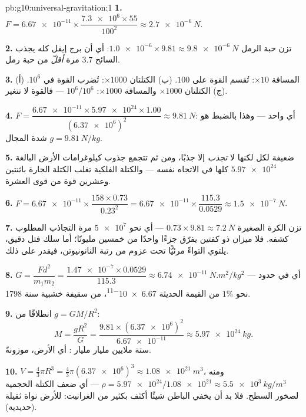 \begin{solution}{pb:g10:universal-gravitation:1}
\textbf{1.} $F = \num{6.67e-11} \times
\dfrac{\num{7.3e6} \times 55}{100^2} \approx \qty{2.7e-6}{N}$.

\textbf{2.} تزن حبة الرمل
$\num{1.0e-6} \times 9.81 \approx \qty{9.8e-6}{N}$: أي أن برج إيفل كله
يجذب السائح $3.7$ مرة \emph{أقلّ} من 
حبة رمل.

\textbf{3.} (أ) المسافة $\times 10$: تُقسم القوة على $100$.
(ب) الكتلتان $\times 1000$: تُضرب القوة في $10^6$.
(ج) الكتلتان $\times 1000$ والمسافة $\times 1000$:
$10^6 / 10^6$ --- فالقوة لا تتغير.

\textbf{4.} $F = \dfrac{\num{6.67e-11} \times \num{5.97e24} \times
1.00}{(\num{6.37e6})^2} \approx \qty{9.81}{N}$: أي  
واحد --- وهذا بالضبط هو شدة المجال
$g = \qty{9.81}{N/kg}$.

\textbf{5.}  ضعيفة لكل  لكنها لا \emph{تجذب} إلا
جذبًا، ومن ثم تتجمع جذوب كيلوغرامات الأرض البالغة $\num{5.97e24}$
كلها في الاتجاه نفسه --- والكتلة الفلكية تغلب
الكتلة الجارة باثنتين وعشرين قوة من قوى العشرة.

\textbf{6.} $F = \num{6.67e-11} \times \dfrac{158 \times 0.73}{0.23^2}
= \num{6.67e-11} \times \dfrac{115.3}{0.0529}
\approx \qty{1.5e-7}{N}$.

\textbf{7.} تزن الكرة الصغيرة
$0.73 \times 9.81 \approx \qty{7.2}{N}$ --- أي نحو $\num{5e7}$ مرة
التجاذب المطلوب كشفه. فلا ميزان ذو كفتين يفرّق جزءًا واحدًا من
خمسين مليونًا؛ أما سلك فتل دقيق، يلتوي التواءً مرئيًّا تحت
عزوم من رتبة النانونيوتن، فيقدر على ذلك.

\textbf{8.} $G = \dfrac{F d^2}{m_1 m_2}
= \dfrac{\num{1.47e-7} \times 0.0529}{115.3}
\approx \qty{6.74e-11}{N.m^2/kg^2}$ --- أي في حدود نحو $1\%$ من
القيمة الحديثة \num{6.67e-11}، من سقيفة خشبية سنة 1798.

\textbf{9.} انطلاقًا من $g = G M / R^2$:
\[
M = \frac{g R^2}{G}
= \frac{9.81 \times (\num{6.37e6})^2}{\num{6.67e-11}}
\approx \qty{5.97e24}{kg}.
\]
ستة ملايين مليار مليار : أي الأرض، موزونةً.

\textbf{10.} $V = \frac43 \pi R^3 = \frac43 \pi
(\num{6.37e6})^3 \approx \qty{1.08e21}{m^3}$، ومنه
$\rho = \num{5.97e24}/\num{1.08e21} \approx \qty{5.5e3}{kg/m^3}$ ---
أي ضعف الكتلة الحجمية لصخور السطح. فلا بد أن يخفي الباطن شيئًا
أكثف بكثير من الغرانيت: للأرض نواة ثقيلة (حديدية).


\end{solution}
